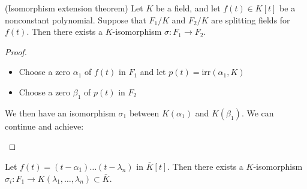 \begin{thm}
(Isomorphism extension theorem) Let $K$ be a field, and let $f(t)\in K[t]$ be a nonconstant polynomial. Suppose that $F_1/K$ and $F_2/K$ are splitting fields for $f(t)$. Then there exists a $K$-isomorphism $\sigma :F_1\rightarrow F_2$.
\end{thm}
\vspace{2ex}
\begin{proof}
\begin{itemize}
\item[(i)] Choose a zero $\alpha_1$ of $f(t)$ in $F_1$ and let $p(t)=\mathrm{irr}(\alpha_1,K)$
\item[(ii)] Choose a zero $\beta_1$ of $p(t)$ in $F_2$
\end{itemize}
We then have an isomorphism $\sigma_1$ between $K(\alpha_1)$ and $K(\beta _1)$. We can continue and achieve:
\begin{center}
\end{center}
\end{proof}
\vspace{2ex}
\begin{rmk}
Let $f(t)=(t-\alpha_1)\ldots (t-\lambda_{n})$ in $\bar{K}[t]$. Then there exists a $K$-isomorphism $\sigma _{i}:F_1\rightarrow K(\lambda_1,\ldots ,\lambda_{n})\subset \bar{K}$.
\end{rmk}
\vspace{2ex}

